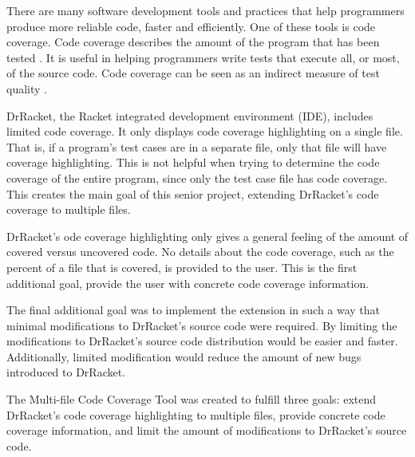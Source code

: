 There are many software development tools and practices that help programmers produce more reliable code, faster and efficiently. One of these tools is code coverage. Code coverage describes the amount of the program that has been tested \cite{lasse}. It is useful in helping programmers write tests that execute all, or most, of the source code. Code coverage can be seen as an indirect measure of test quality \cite{lasse}.

DrRacket, the Racket integrated development environment (IDE), includes limited code coverage. It only displays code coverage highlighting on a single file. That is, if a program's test cases are in a separate file, only that file will have coverage highlighting. This is not helpful when trying to determine the code coverage of the entire program, since only the test case file has code coverage. This creates the main goal of this senior project, extending DrRacket's code coverage to multiple files. 

DrRacket's ode coverage highlighting only gives a general feeling of the amount of covered versus uncovered code. No details about the code coverage, such as the percent of a file that is covered, is provided to the user. This is the first additional goal, provide the user with concrete code coverage information.

The final additional goal was to implement the extension in such a way that minimal modifications to DrRacket's source code were required. By limiting the modifications to DrRacket's source code distribution would be easier and faster. Additionally, limited modification would reduce the amount of new bugs introduced to DrRacket.

The Multi-file Code Coverage Tool was created to fulfill three goals: extend DrRacket's code coverage highlighting to multiple files, provide concrete code coverage information, and limit the amount of modifications to DrRacket's source code.